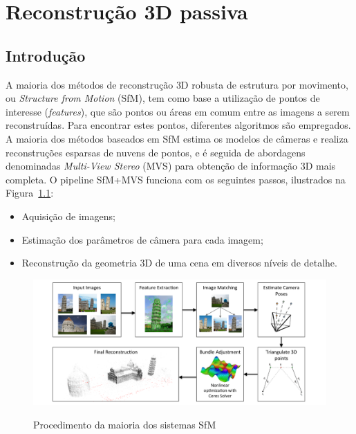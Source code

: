 \doublespacing
\chapter{Reconstrução 3D passiva}\label{cap:pontosdeinteresse}
\doublespacing
\section{Introdução}

A maioria dos métodos de reconstrução 3D robusta de estrutura por movimento, ou \emph{Structure
from Motion} (SfM), tem como base a utilização de pontos de interesse
(\emph{features}), que são pontos ou áreas em comum entre as imagens a serem
reconstruídas. Para encontrar estes pontos, diferentes algoritmos são empregados. 
A maioria dos métodos baseados em SfM estima os modelos de câmeras e
realiza reconstruções esparsas de nuvens de pontos, e é seguida de abordagens denominadas
\emph{Multi-View Stereo} (MVS) para obtenção de informação 3D mais completa.  O
pipeline SfM+MVS funciona com os seguintes passos, ilustrados na Figura~\ref{fig:sfmpipeline}:

\begin{itemize}
\item{Aquisição de imagens;}
\item{Estimação dos parâmetros de câmera para cada imagem;}
\item{Reconstrução da geometria 3D de uma cena em diversos níveis de detalhe.}
\end{itemize}

\begin{figure}[!h]
	\centering
	\caption{Procedimento da maioria dos sistemas SfM}
	\includegraphics[width=0.98\linewidth]{figs/pipelinesfm.png}
   \label{fig:sfmpipeline}
\end{figure}

